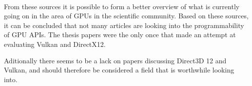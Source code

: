 \paragraph{}
From these sources it is possible to form a better overview of what is currently going on in the area of \glspl{GPU} in the scientific community. 
Based on these sources, it can be concluded that not many articles are looking into the programmability of \gls{GPU} \glspl{API}. 
The thesis papers were the only once that made an attempt at evaluating Vulkan and DirectX12.

Aditionally there seems to be a lack on papers discussing Direct3D 12 and Vulkan, and should therefore be considered a field that is worthwhile looking into.
